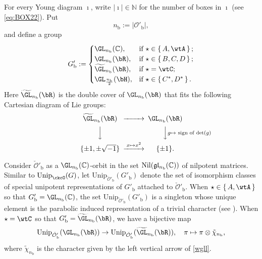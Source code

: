 \documentclass[11pt,a4paper]{amsart}
\def\abs#1{\left|{#1}\right|}
\newcommand{\BN}{{\mathbb {N}}}
\newcommand{\CO}{{\mathcal {O}}}
\newcommand{\gl}{\mathfrak g \mathfrak l}
\numberwithin{equation}{section}
\theoremstyle{remark}
\def\Unip{\mathrm{Unip}}
\begin{document}
 For every Young diagram $\imath$, write $\abs{\imath}\in \BN$ for the number of boxes in $\imath$ (see \eqref{eq:BOX22}). Put
 \[
   n_\mathrm b:=\abs{\CO'_\mathrm b},
 \]
 and define a group
 \begin{equation}\label{Gpb}
  G'_\mathrm b := \begin{cases}
  \GL_{n_\mathrm b}(\C),  & \text{if } \star \in \set{A, \wtA}; \\
    \GL_{n_\mathrm b}(\bR), & \text{if } \star \in \set{B,C,D}; \\
       \widetilde{ \GL}_{n_\mathrm b}(\bR), & \text{if } \star =\wtC; \\
    \GL_{\frac{n_\mathrm b}{2}}(\bH), & \text{if } \star \in \set{C^{*},D^{*}}. \\
  \end{cases}
\end{equation}
Here $ \widetilde{ \GL}_{n_\mathrm b}(\bR)$ is the double cover of $ \GL_{n_\mathrm b}(\bR)$ that fits the following Cartesian diagram of Lie groups:
\begin{equation}\label{wgll}
\begin{CD}
 \widetilde{ \GL}_{n_\mathrm b}(\bR)@>>>  \GL_{n_\mathrm b}(\bR)\\
  @VVV @VV g\mapsto \textrm{ sign of $\det(g)$} V\\
  \{\pm 1, \pm \sqrt{-1}\} @> x\mapsto x^2 >> \{\pm 1\}. \\
\end{CD}
\end{equation}

Consider $\check \CO'_\mathrm b$ as a $\GL_{n_\mathrm b}(\C)$-orbit in the set $\mathrm{Nil}(\gl_{n_\mathrm b}(\C))$ of nilpotent matrices. Similar to $\Unip_{\ckcO}(G)$,  let $\Unip_{\check \CO'_\mathrm b}(G'_\mathrm b)$ denote the set of isomorphism classes of special unipotent representations of $G'_\mathrm b$ attached to $\check \CO'_\mathrm b$. When $\star \in \set{A, \wtA}$ so that $G'_\mathrm b=\GL_{n_\mathrm b}(\C)$, the set  $\Unip_{\check \CO'_\mathrm b}(G'_\mathrm b)$ is a singleton whose  unique element is the parabolic induced representation of a trivial character (see \cite[Section 2.9]{BMSZa}). When $\star=\wtC$ so that $G'_\mathrm b= \widetilde{ \GL}_{n_\mathrm b}(\bR)$, we have a  bijective map
 \[
    \Unip_{\check \CO'_\mathrm b}(\GL_{n_\mathrm b}(\bR))\rightarrow  \Unip_{\check \CO'_\mathrm b}(\widetilde{ \GL}_{n_\mathrm b}(\bR)), \quad \pi\mapsto \pi\otimes \tilde \chi_{n_\mathrm b},
 \]
 where $\tilde \chi_{n_\mathrm b}$ is the character given by the left vertical arrow of \eqref{wgll}.
 
\end{document}
